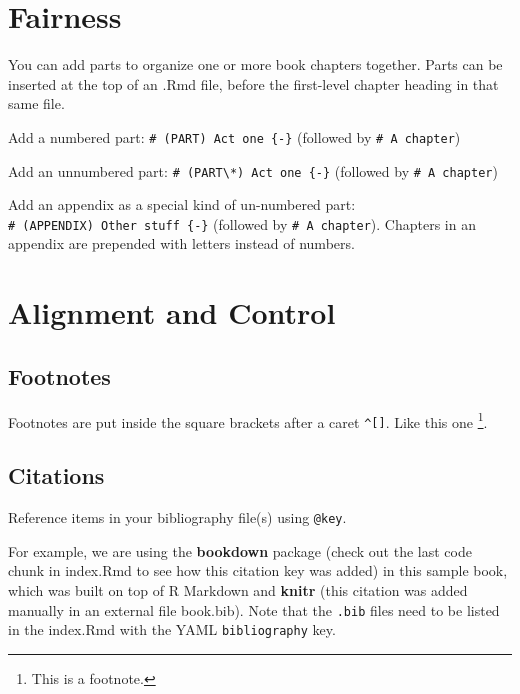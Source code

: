 \documentclass[
]{book}
\theoremstyle{definition}
\theoremstyle{definition}
\theoremstyle{definition}
\theoremstyle{definition}
\theoremstyle{remark}
\begin{document}
\hypertarget{ch-fairness}{%
\chapter{Fairness}\label{ch-fairness}}

You can add parts to organize one or more book chapters together. Parts can be inserted at the top of an .Rmd file, before the first-level chapter heading in that same file.

Add a numbered part: \texttt{\#\ (PART)\ Act\ one\ \{-\}} (followed by \texttt{\#\ A\ chapter})

Add an unnumbered part: \texttt{\#\ (PART\textbackslash{}*)\ Act\ one\ \{-\}} (followed by \texttt{\#\ A\ chapter})

Add an appendix as a special kind of un-numbered part: \texttt{\#\ (APPENDIX)\ Other\ stuff\ \{-\}} (followed by \texttt{\#\ A\ chapter}). Chapters in an appendix are prepended with letters instead of numbers.

\hypertarget{ch-alignment-and-control}{%
\chapter{Alignment and Control}\label{ch-alignment-and-control}}

\hypertarget{footnotes}{%
\section{Footnotes}\label{footnotes}}

Footnotes are put inside the square brackets after a caret \texttt{\^{}{[}{]}}. Like this one \footnote{This is a footnote.}.

\hypertarget{citations}{%
\section{Citations}\label{citations}}

Reference items in your bibliography file(s) using \texttt{@key}.

For example, we are using the \textbf{bookdown} package \citep{R-bookdown} (check out the last code chunk in index.Rmd to see how this citation key was added) in this sample book, which was built on top of R Markdown and \textbf{knitr} \citep{xie2015} (this citation was added manually in an external file book.bib).
Note that the \texttt{.bib} files need to be listed in the index.Rmd with the YAML \texttt{bibliography} key.
\end{document}
